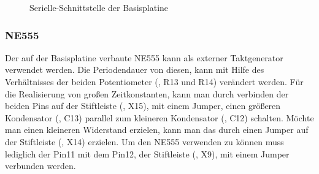 \begin{figure}[htb]
    \centering
    \qquad
    \qquad
    \caption[Serielle-Schnittstelle der Basisplatine]{Serielle-Schnittstelle der \gls{Basisplatine}}
    \label{fig:basisplatine-rs232}
\end{figure}

\subsubsection{NE555}
Der auf der \gls{Basisplatine} verbaute NE555 kann als externer Taktgenerator verwendet werden. Die Periodendauer von diesen, kann mit Hilfe des Verhältnisses der beiden Potentiometer (, R13 und R14) verändert werden. Für die Realisierung von großen Zeitkonstanten, kann man durch verbinden der beiden Pins auf der Stiftleiste (, X15), mit einem Jumper, einen größeren Kondensator (, C13) parallel zum kleineren Kondensator (, C12) schalten. Möchte man einen kleineren Widerstand erzielen, kann man das durch einen Jumper auf der Stiftleiste (, X14) erzielen. Um den NE555 verwenden zu können muss lediglich der Pin11 mit dem Pin12, der Stiftleiste (, X9), mit einem Jumper verbunden werden.

